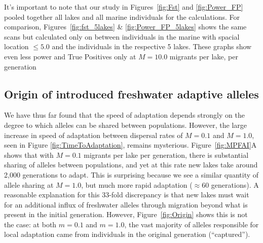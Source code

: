 \documentclass{article}
\begin{document}
It's important to note that our study in Figures~\ref{fig:Fst} and \ref{fig:Power_FP} pooled together all lakes and all marine individuals for the calculations. 
For comparison, Figures~\ref{fig:fst_5lakes} \& \ref{fig:Power_FP_5lakes} shows the same scans but calculated 
only on between individuals in the marine with spacial location $\le 5.0$ and the individuals in the respective 5 lakes.
These graphs show even less power and True Positives only at $ M = 10.0$ migrants per lake, per generation



\subsection*{Origin of introduced freshwater adaptive alleles}

We have thus far found that the speed of adaptation depends strongly
on the degree to which alleles can be shared between populations.
However, the large increase in speed of adaptation between dispersal rates of $M = 0.1$ and $M = 1.0$, 
seen in Figure \ref{fig:TimeToAdaptation}, remains mysterious.
Figure~\ref{fig:MPFAI}A shows that with $M = 0.1$ migrants per lake per generation, 
there is substantial sharing of alleles between populations,
and yet at this rate new lakes take around 2,000 generations to adapt.
This is surprising because we see a similar quantity of allele sharing at  $M = 1.0$, 
but much more rapid adaptation ($\approx 60$ generations).
A reasonable explanation for this 33-fold discrepancy is that 
new lakes must wait for an additional influx of freshwater alleles through migration
beyond what is present in the initial generation.
However, Figure~\ref{fig:Origin} shows this is not the case: at both $m = 0.1$ and $m = 1.0$,
the vast majority of alleles responsible for local adaptation
came from individuals in the original generation (``captured'').
\end{document}
